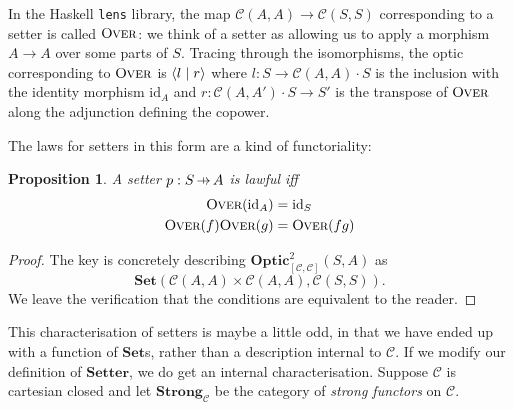 \documentclass[11pt,letterpaper]{article}
\theoremstyle{plain}
\newtheorem{proposition}[theorem]{Proposition}
\theoremstyle{definition}
\newcommand{\C}{\mathscr{C}}
\newcommand{\lenslib}{\texttt{lens}}
\newcommand{\Set}{\mathbf{Set}}
\newcommand{\Strong}{\mathbf{Strong}}
\newcommand{\Twoptic}{\mathbf{Optic}^2}
\newcommand{\Setter}{\mathbf{Setter}}
\newcommand{\id}{\mathrm{id}}
\newcommand{\rep}[2]{{\ensuremath \left\langle #1 \mid #2 \right\rangle}}
\newcommand{\fover}{\textsc{Over}}
\newcommand{\hto}{\ensuremath{\,\mathaccent\shortmid\rightarrow\,}}
\newcommand{\todo}[1]{\textcolor{red}{\small #1}}
\begin{document}
In the Haskell \lenslib{} library, the map $\C(A, A) \to \C(S,S)$ corresponding to a setter is called $\fover$: we think of a setter as allowing us to apply a morphism $A \to A$ over some parts of $S$. Tracing through the isomorphisms, the optic corresponding to $\fover$ is $\rep{l}{r}$ where $l : S \to \C(A, A) \cdot S$ is the inclusion with the identity morphism $\id_A$ and $r : \C(A, A') \cdot S \to S'$ is the transpose of $\fover$ along the adjunction defining the copower.

The laws for setters in this form are a kind of functoriality:

\begin{proposition}
A setter $p : S \hto A$ is lawful iff
\begin{align*}
\fover(\id_A) &= \id_S \\
\fover(f)\fover(g)&= \fover(fg)
\end{align*}
\end{proposition}
\begin{proof}
The key is concretely describing $\Twoptic_{[\C, \C]}(S, A)$ as \[ \Set( \C(A, A) \times \C(A, A), \C(S, S) ).\] We leave the verification that the conditions are equivalent to the reader. %
\end{proof}

This characterisation of setters is maybe a little odd, in that we have ended up with a function of $\Set$s, rather than a description internal to $\C$. If we modify our definition of $\Setter$, we do get an internal characterisation. Suppose $\C$ is cartesian closed and let $\Strong_\C$ be the category of \emph{strong functors} on $\C$. %
\end{document}
